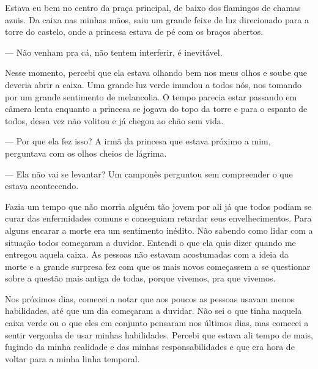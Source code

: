 Estava eu bem no centro da praça principal, de baixo dos flamingos de chamas azuis. Da caixa nas minhas mãos, saiu um grande feixe de luz direcionado para a torre do castelo, onde a princesa estava de pé com os braços abertos.

— Não venham pra cá, não tentem interferir, é inevitável.

Nesse momento, percebi que ela estava olhando bem nos meus olhos e soube que deveria abrir a caixa. Uma grande luz verde inundou a todos nós, nos tomando por um grande sentimento de melancolia. O tempo parecia estar passando em câmera lenta enquanto a princesa se jogava do topo da torre e para o espanto de todos, dessa vez não volitou e já chegou ao chão sem vida.

— Por que ela fez isso? A irmã da princesa que estava próximo a mim, perguntava com os olhos cheios de lágrima.

— Ela não vai se levantar? Um camponês perguntou sem compreender o que estava acontecendo.

Fazia um tempo que não morria alguém tão jovem por ali já que todos podiam se curar das enfermidades comuns e conseguiam retardar seus envelhecimentos. Para alguns encarar a morte era um sentimento inédito. Não sabendo como lidar com a situação todos começaram a duvidar. Entendi o que ela quis dizer quando me entregou aquela caixa.
As pessoas não estavam acostumadas com a ideia da morte e a grande surpresa fez com que os mais novos começassem a se questionar sobre a questão mais antiga de todas, porque vivemos, pra que vivemos.

Nos próximos dias, comecei a notar que aos poucos as pessoas usavam menos habilidades, até que um dia começaram a duvidar. Não sei o que tinha naquela caixa verde ou o que eles em conjunto pensaram nos últimos dias, mas comecei a sentir vergonha de usar minhas habilidades. Percebi que estava ali tempo de mais, fugindo da minha realidade e das minhas responsabilidades e que era hora de voltar para a minha linha temporal.
